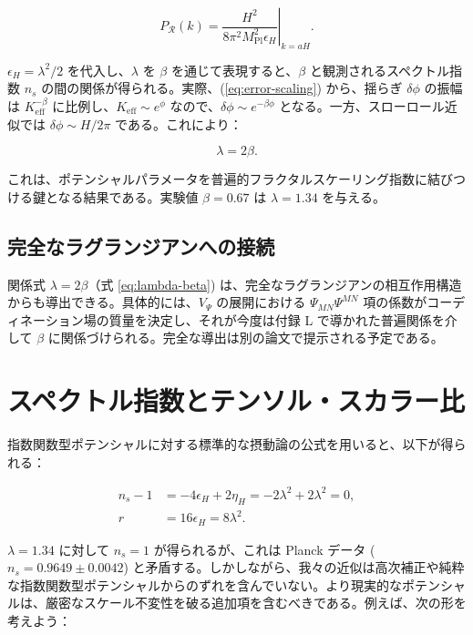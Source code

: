 \documentclass[11pt,a4paper]{article}
\newcommand{\Keff}{K_{\mathrm{eff}}}
\newcommand{\Mpl}{M_{\mathrm{Pl}}}
\newcommand{\rs}{r}
\begin{document}
	\begin{equation}
		P_{\mathcal{R}}(k) = \left. \frac{H^2}{8\pi^2 \Mpl^2 \epsilon_H} \right|_{k=aH}.
	\end{equation}
	
	\(\epsilon_H = \lambda^2/2\) を代入し、\(\lambda\) を \(\beta\) を通じて表現すると、\(\beta\) と観測されるスペクトル指数 \(n_s\) の間の関係が得られる。実際、(\ref{eq:error-scaling}) から、揺らぎ \(\delta \phi\) の振幅は \(\Keff^{-\beta}\) に比例し、\(\Keff \sim e^{\phi}\) なので、\(\delta \phi \sim e^{-\beta \phi}\) となる。一方、スローロール近似では \(\delta \phi \sim H/2\pi\) である。これにより：
	
	\begin{equation}
		\lambda = 2\beta.
		\label{eq:lambda-beta}
	\end{equation}
	
	これは、ポテンシャルパラメータを普遍的フラクタルスケーリング指数に結びつける鍵となる結果である。実験値 \(\beta = 0.67\) は \(\lambda = 1.34\) を与える。
	
	\subsection{完全なラグランジアンへの接続}
	
	関係式 \(\lambda = 2\beta\)（式 \ref{eq:lambda-beta}) は、完全なラグランジアンの相互作用構造からも導出できる。具体的には、\(V_{\Psi}\) の展開における \(\Psi_{MN}\Psi^{MN}\) 項の係数がコーディネーション場の質量を決定し、それが今度は付録 L で導かれた普遍関係を介して \(\beta\) に関係づけられる。完全な導出は別の論文で提示される予定である。
	
	\section{スペクトル指数とテンソル・スカラー比}
	\label{sec:predictions}
	
	指数関数型ポテンシャルに対する標準的な摂動論の公式を用いると、以下が得られる：
	
	\begin{align}
		n_s - 1 &= -4\epsilon_H + 2\eta_H = -2\lambda^2 + 2\lambda^2 = 0, \label{eq:ns-temp}\\
		\rs &= 16\epsilon_H = 8\lambda^2. \label{eq:r-pred}
	\end{align}
	
	\(\lambda = 1.34\) に対して \(n_s = 1\) が得られるが、これは Planck データ (\(n_s = 0.9649 \pm 0.0042\)) と矛盾する。しかしながら、我々の近似は高次補正や純粋な指数関数型ポテンシャルからのずれを含んでいない。より現実的なポテンシャルは、厳密なスケール不変性を破る追加項を含むべきである。例えば、次の形を考えよう：
	
\end{document}
